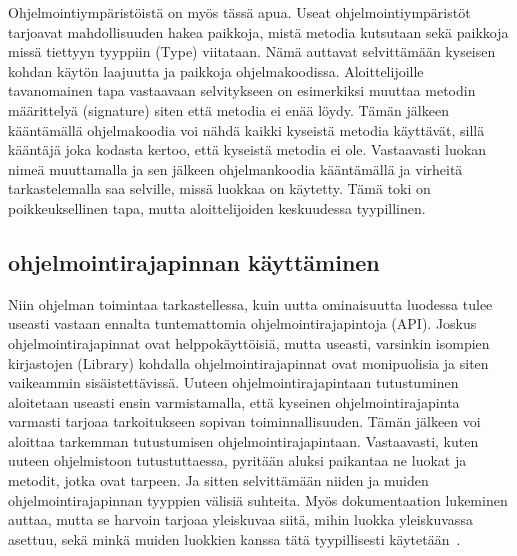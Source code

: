 \documentclass[finnish]{../tktltiki2}
\theoremstyle{definition}
\theoremstyle{remark}
\begin{document}
Ohjelmointiympäristöistä on myös tässä apua. Useat ohjelmointiympäristöt tarjoavat mahdollisuuden hakea paikkoja, mistä metodia kutsutaan sekä paikkoja missä tiettyyn tyyppiin (Type) viitataan. Nämä auttavat selvittämään kyseisen kohdan käytön laajuutta ja paikkoja ohjelmakoodissa. Aloittelijoille tavanomainen tapa vastaavaan selvitykseen on esimerkiksi muuttaa metodin määrittelyä (signature) siten että metodia ei enää löydy. Tämän jälkeen kääntämällä ohjelmakoodia voi nähdä kaikki kyseistä metodia käyttävät, sillä kääntäjä joka kodasta kertoo, että kyseistä metodia ei ole. Vastaavasti luokan nimeä muuttamalla ja sen jälkeen ohjelmankoodia kääntämällä ja virheitä tarkastelemalla saa selville, missä luokkaa on käytetty. Tämä toki on poikkeuksellinen tapa, mutta aloittelijoiden keskuudessa tyypillinen.

\subsection{ohjelmointirajapinnan käyttäminen}
Niin ohjelman toimintaa tarkastellessa, kuin uutta ominaisuutta luodessa tulee useasti vastaan ennalta tuntemattomia ohjelmointirajapintoja (API). Joskus ohjelmointirajapinnat ovat helppokäyttöisiä, mutta useasti, varsinkin isompien kirjastojen (Library) kohdalla ohjelmointirajapinnat ovat monipuolisia ja siten vaikeammin sisäistettävissä.
Uuteen ohjelmointirajapintaan tutustuminen aloitetaan useasti ensin varmistamalla, että kyseinen ohjelmointirajapinta varmasti tarjoaa tarkoitukseen sopivan toiminnallisuuden. Tämän jälkeen voi aloittaa tarkemman tutustumisen ohjelmointirajapintaan.
Vastaavasti, kuten uuteen ohjelmistoon tutustuttaessa, pyritään aluksi paikantaa ne luokat ja metodit, jotka ovat tarpeen. Ja sitten selvittämään niiden ja muiden ohjelmointirajapinnan tyyppien välisiä suhteita. Myös dokumentaation lukeminen auttaa, mutta se harvoin tarjoaa yleiskuvaa siitä, mihin luokka yleiskuvassa asettuu, sekä minkä muiden luokkien kanssa tätä tyypillisesti käytetään~\cite{asking-and-answering-api-questions}.
\end{document}
